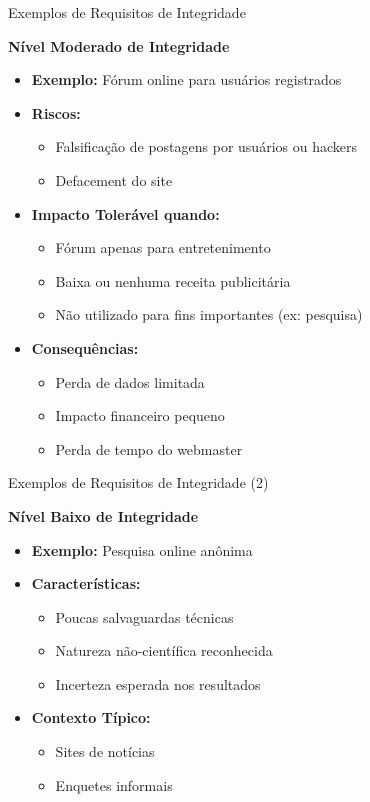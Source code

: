 \begin{frame}{Exemplos de Requisitos de Integridade}
  
  \begin{block}{\textbf{Nível Moderado de Integridade}}
    \begin{itemize}
      \item \textbf{Exemplo:} Fórum online para usuários registrados
      \item \textbf{Riscos:}
      \begin{itemize}
        \item Falsificação de postagens por usuários ou hackers
        \item Defacement do site
      \end{itemize}
      \item \textbf{Impacto Tolerável quando:}
      \begin{itemize}
        \item Fórum apenas para entretenimento
        \item Baixa ou nenhuma receita publicitária
        \item Não utilizado para fins importantes (ex: pesquisa)
      \end{itemize}
      \item \textbf{Consequências:}
      \begin{itemize}
        \item Perda de dados limitada
        \item Impacto financeiro pequeno
        \item Perda de tempo do webmaster
      \end{itemize}
    \end{itemize}
  \end{block}
\end{frame}
\begin{frame}{Exemplos de Requisitos de Integridade (2)}
    
  \begin{block}{\textbf{Nível Baixo de Integridade}}
    \begin{itemize}
      \item \textbf{Exemplo:} Pesquisa online anônima
      \item \textbf{Características:}
      \begin{itemize}
        \item Poucas salvaguardas técnicas
        \item Natureza não-científica reconhecida
        \item Incerteza esperada nos resultados
      \end{itemize}
      \item \textbf{Contexto Típico:}
      \begin{itemize}
        \item Sites de notícias
        \item Enquetes informais
      \end{itemize}
    \end{itemize}
  \end{block}
\end{frame}

